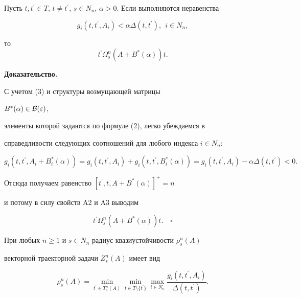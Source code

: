 \begin{lem}


Пусть $t,t^{\prime}\in T$, $t\neq


t^{\prime}$, $s\in N_n$, $\alpha>0$. Если выполняются неравенства


\begin{equation} 


g_i(t,t^{\prime},A_i)<\alpha


\Delta(t,t^{\prime}),\ \ i\in N_n,


\end{equation}


то $$


t^{\prime} \Omega^n_s(A+B^*(\alpha)) t.


$$


\end{lem}








{\bf Доказательство.}


С учетом (3) и структуры возмущающей матрицы


$B^*(\alpha)\in {\cal B} (\varepsilon)$,


элементы которой задаются по формуле (2), легко убеждаемся в


справедливости следующих соотношений для любого индекса $i\in N_n$:


$$


g_i(t,t^{\prime},A_i+B^*_i(\alpha))=


g_i(t,t^{\prime},A_i)+g_i(t,t^{\prime},B^*_i(\alpha))=


g_i(t,t^{\prime},A_i)-\alpha\Delta(t,t^{\prime})<0.


$$


Отсюда получаем равенство $[t^{\prime},t,A+B^*(\alpha)]^+=n$


и потому в силу свойств A2 и A3 выводим


$$


t^{\prime} \Omega^n_s(A+B^*(\alpha)) t.\quad \square


$$





\begin{thmnonum}


При любых $n \geq 1$ и $s\in N_n$ радиус квазиустойчивости $\rho^n_s(A)$


векторной траекторной задачи $Z^n_s(A)$ имеет вид


\begin{equation} 


\rho^n_s(A)=\min_{t^{\prime}\in T^n_s(A)} \min_{t\in T\setminus


\{t^{\prime}\}}


\max_{i\in N_n} \frac{g_i(t,t^{\prime},A_i)}{\Delta(t,t^{\prime})}.


\end{equation}


\end{thmnonum}





